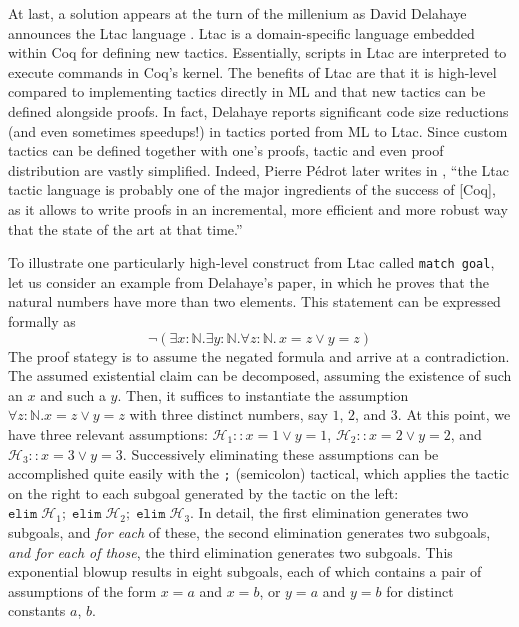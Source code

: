 At last, a solution appears at the turn of the millenium as David Delahaye
announces the Ltac language \cite{Delahaye:LPAR00}.
Ltac is a domain-specific language embedded within Coq for defining new
tactics.
Essentially, scripts in Ltac are interpreted to execute commands in Coq's
kernel.
The benefits of Ltac are that it is high-level compared to implementing tactics
directly in ML and that new tactics can be defined alongside proofs.
In fact, Delahaye reports significant code size reductions (and even sometimes
speedups!) in tactics ported from ML to Ltac.
Since custom tactics can be defined together with one's proofs, tactic and even
proof distribution are vastly simplified.
Indeed, Pierre Pédrot later writes in \cite{ltac2}, ``the Ltac tactic language
is probably one of the major ingredients of the success of [Coq], as it allows
to write proofs in an incremental, more efficient and more robust way that the
state of the art at that time.''

To illustrate one particularly high-level construct from Ltac called
\texttt{match goal}, let us consider an example from Delahaye's paper, in which
he proves that the natural numbers have more than two elements.
This statement can be expressed formally as
\newcommand{\N}{\mathbb{N}}%
\[
  \neg (\exists x{:}\N.\exists y{:}\N.\forall z{:}\N.\, x = z \lor y = z)
\]
%
%
The proof stategy is to assume the negated formula and arrive at a
contradiction.
The assumed existential claim can be decomposed, assuming the existence of such
an $x$ and such a $y$.
Then, it suffices to instantiate the assumption $\forall z{:}\N. x = z \lor y =
z$ with three distinct numbers, say $1$, $2$, and $3$.
At this point, we have three relevant assumptions:
\renewcommand{\H}{\mathcal{H}}
$\H_1 :: x = 1 \lor y = 1$,
$\H_2 :: x = 2 \lor y = 2$, and
$\H_3 :: x = 3 \lor y = 3$.
Successively eliminating these assumptions can be accomplished quite easily with
the \texttt{;} (semicolon) tactical, which applies the tactic on the right to
each subgoal generated by the tactic on the left:
\newcommand{\elim}{\mathtt{elim}\;}
$\elim \H_1;\; \elim \H_2;\; \elim \H_3$.
In detail, the first elimination generates two subgoals, and \emph{for each} of
these, the second elimination generates two subgoals,
\emph{and for each of those}, the third elimination generates two subgoals.
This exponential blowup results in eight subgoals, each of which contains a
pair of assumptions of the form $x = a$ and $x = b$, or $y = a$ and $y = b$ for
distinct constants $a$, $b$.

